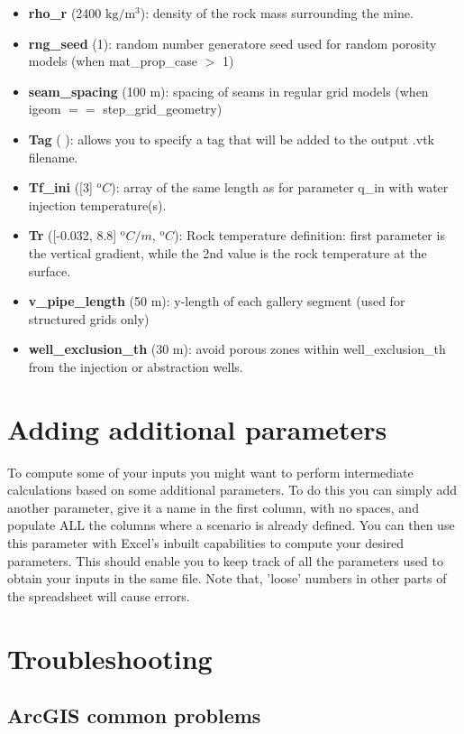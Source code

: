 \begin{itemize}
\item {\bf rho\_r} (2400 $\mathrm{kg/m^3}$): density of the rock mass surrounding the mine.
\item {\bf rng\_seed} (1): random number generatore seed used for random porosity models (when mat\_prop\_case $>$ 1)
\item {\bf seam\_spacing} (100 m): spacing of seams in regular grid models (when igeom $==$ step\_grid\_geometry)
\item \textbf{Tag} ( ): allows you to specify a tag that will be added to the output .vtk filename.
\item {\bf Tf\_ini} ([3] $\mathrm{{}^o}C$): array of the same length as for parameter q\_in with water injection temperature(s).
\item {\bf Tr} ([-0.032, 8.8] $\mathrm{{}^o}C/m$, $\mathrm{{}^o}C$): Rock temperature definition: first parameter is the vertical gradient, while the 2nd value is the rock temperature at the surface. 
\item {\bf v\_pipe\_length} (50 m): y-length of each gallery segment (used for structured grids only) 
\item {\bf well\_exclusion\_th} (30 m): avoid porous zones within well\_exclusion\_th from the injection or abstraction wells. 
\end{itemize}

\section{Adding additional parameters}
To compute some of your inputs you might want to perform intermediate calculations based on some additional parameters. To do this you can simply add another parameter, give it a name in the first column, with no spaces, and populate ALL the columns where a scenario is already defined. You can then use this parameter with Excel's inbuilt capabilities to compute your desired parameters. This should enable you to keep track of all the parameters used to obtain your inputs in the same file. Note that, 'loose' numbers in other parts of the spreadsheet will cause errors.

\section{Troubleshooting}
\subsection{ArcGIS common problems}
